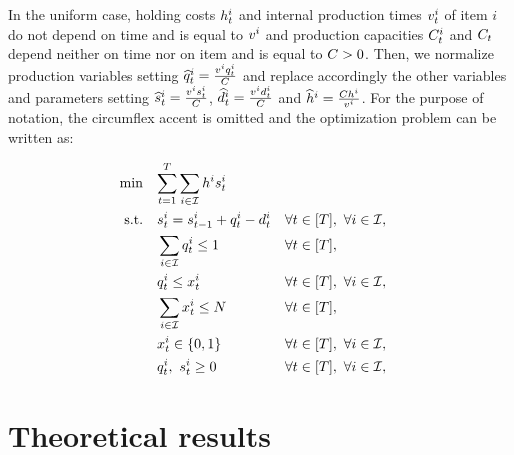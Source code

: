 \medskip

In the uniform case, holding costs $h_t^i$ and internal production times $v_t^i$ of item $i$ do not depend on time and is equal to $v^i$ and production capacities $C_t^i$ and $C_t$ depend neither on time nor on item and is equal to $C>0$.
Then, we normalize production variables setting $\widehat{q}_t^i=\frac{v^iq_t^i}{C}$ and replace accordingly the other variables and parameters setting $\widehat{s}_t^i=\frac{v^is_t^i}{C}$, $\widehat{d}_t^i=\frac{v^id_t^i}{C}$ and $\widehat{h}^i=\frac{Ch^i}{v^i}$.
For the purpose of notation, the circumflex accent is omitted and the optimization problem can be written as:

\begin{subequations}\label{eq:Uniform-CLSP-BS}
  \begin{align}
    \min\quad & \rlap{$\ds \sum_{t=1}^{\horizon} \sum_{i\in\REF} \holding^i \inventory_t^i$}
    \label{eq:Uniform-CLSP-BS:objective}
    \\
    \st\quad & \ds \inventory_t^i = \inventory_{t-1}^i + \quantity_t^i - \demand_t^i && \forall t\in\range{\horizon},\ \forall i\in\REF,
    \label{eq:Uniform-CLSP-BS:stock-dynamics}
    \\
    & \ds \sum_{i\in\REF} \quantity_t^i \le 1 && \forall t\in\range{\horizon},
    \label{eq:Uniform-CLSP-BS:capacity}
    \\
    & \ds \quantity_t^i \le \setup_t^i && \forall t\in\range{\horizon},\ \forall i\in\REF,
    \label{eq:Uniform-CLSP-BS:item-capacity}
    \\
    & \ds \sum_{i\in\REF} \setup_t^i \le \nbsetups && \forall t\in\range{\horizon},
    \label{eq:Uniform-CLSP-BS:setups}
    \\
    & \ds \setup_t^i \in \crbracket{0,1} && \forall t\in\range{\horizon},\ \forall i\in\REF,
    \label{eq:Uniform-CLSP-BS:boolean}
    \\
    & \ds \quantity_t^i,\ \inventory_t^i \ge 0 && \forall t\in\range{\horizon},\ \forall i\in\REF,
    \label{eq:Uniform-CLSP-BS:positivity}
  \end{align}
\end{subequations}


\section{Theoretical results}


